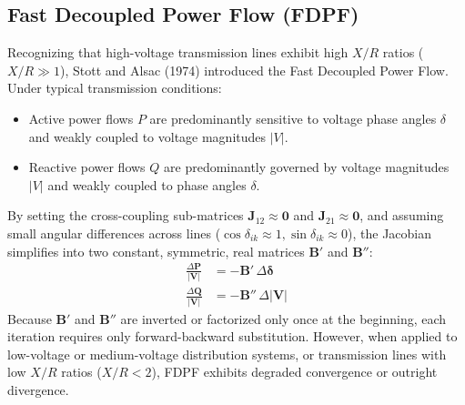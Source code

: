 \documentclass[12pt,a4paper,oneside]{report}
\begin{document}
\subsection{Fast Decoupled Power Flow (FDPF)}
Recognizing that high-voltage transmission lines exhibit high $X/R$ ratios ($X/R \gg 1$), Stott and Alsac (1974) introduced the Fast Decoupled Power Flow. Under typical transmission conditions:
\begin{itemize}
    \item Active power flows $P$ are predominantly sensitive to voltage phase angles $\delta$ and weakly coupled to voltage magnitudes $|V|$.
    \item Reactive power flows $Q$ are predominantly governed by voltage magnitudes $|V|$ and weakly coupled to phase angles $\delta$.
\end{itemize}
By setting the cross-coupling sub-matrices $\mathbf{J}_{12} \approx \mathbf{0}$ and $\mathbf{J}_{21} \approx \mathbf{0}$, and assuming small angular differences across lines ($\cos\delta_{ik} \approx 1, \sin\delta_{ik} \approx 0$), the Jacobian simplifies into two constant, symmetric, real matrices $\mathbf{B}'$ and $\mathbf{B}''$:
\begin{align}
\frac{\Delta \mathbf{P}}{|\mathbf{V}|} &= -\mathbf{B}' \, \Delta \boldsymbol{\delta} \\
\frac{\Delta \mathbf{Q}}{|\mathbf{V}|} &= -\mathbf{B}'' \, \Delta |\mathbf{V}|
\end{align}
Because $\mathbf{B}'$ and $\mathbf{B}''$ are inverted or factorized only once at the beginning, each iteration requires only forward-backward substitution. However, when applied to low-voltage or medium-voltage distribution systems, or transmission lines with low $X/R$ ratios ($X/R < 2$), FDPF exhibits degraded convergence or outright divergence.
\end{document}

